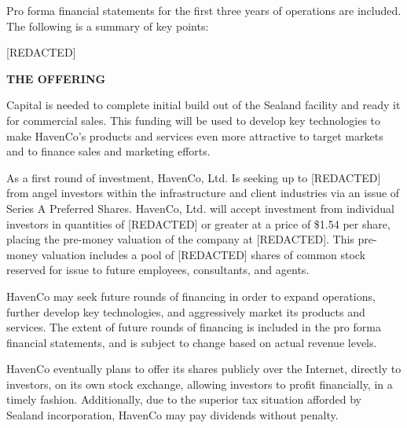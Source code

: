 Pro forma financial statements for the first three years of operations are included. The following is a summary of key points:

[REDACTED]

\textbf{THE OFFERING}

Capital is needed to complete initial build out of the Sealand facility and ready it for commercial sales. This funding will be used to develop key technologies to make HavenCo's products and services even more attractive to target markets and to finance sales and marketing efforts.

As a first round of investment, HavenCo, Ltd. Is seeking up to [REDACTED] from angel investors within the infrastructure and client industries via an issue of Series A Preferred Shares. HavenCo, Ltd. will accept investment from individual investors in quantities of [REDACTED] or greater at a price of \$1.54 per share, placing the pre-money valuation of the company at [REDACTED]. This pre-money valuation includes a pool of [REDACTED] shares of common stock reserved for issue to future employees, consultants, and agents.

HavenCo may seek future rounds of financing in order to expand operations, further develop key technologies, and aggressively market its products and services. The extent of future rounds of financing is included in the pro forma financial statements, and is subject to change based on actual revenue levels.

HavenCo eventually plans to offer its shares publicly over the Internet, directly to investors, on its own stock exchange, allowing investors to profit financially, in a timely fashion.  Additionally, due to the superior tax situation afforded by Sealand incorporation, HavenCo may pay dividends without penalty.

 

 